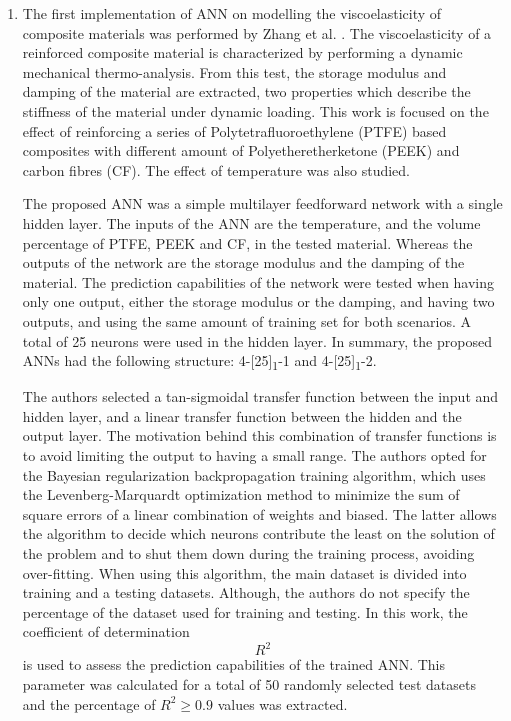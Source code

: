 \begin{enumerate}
    \item The first implementation of ANN on modelling the viscoelasticity of composite materials was performed by Zhang et al. \cite{zhang2002dynamic}. The viscoelasticity of a reinforced composite material is characterized by performing a dynamic mechanical thermo-analysis. From this test, the storage modulus and damping of the material are extracted, two properties which describe the stiffness of the material under dynamic loading. This work is focused on the effect of reinforcing a series of Polytetrafluoroethylene (PTFE) based composites with different amount of Polyetheretherketone (PEEK) and carbon fibres (CF). The effect of temperature was also studied. 
    
    The proposed ANN was a simple multilayer feedforward network with a single hidden layer. The inputs of the ANN are the temperature, and the volume percentage of PTFE, PEEK and CF, in the tested material. Whereas the outputs of the network are the storage modulus and the damping of the material. The prediction capabilities of the network were tested when having only one output, either the storage modulus or the damping, and having two outputs, and using the same amount of training set for both scenarios. A total of 25 neurons were used in the hidden layer. In summary, the proposed ANNs had the following structure: 4-[25]\textsubscript{1}-1 and  4-[25]\textsubscript{1}-2.
    
    The authors selected a tan-sigmoidal transfer function between the input and hidden layer, and a linear transfer function between the hidden and the output layer. The motivation behind this combination of transfer functions is to avoid limiting the output to having a small range. The authors opted for the Bayesian regularization backpropagation training algorithm, which uses the Levenberg-Marquardt optimization method to minimize the sum of square errors of a linear combination of weights and biased. The latter allows the algorithm to decide which neurons contribute the least on the solution of the problem and to shut them down during the training process, avoiding over-fitting. When using this algorithm, the main dataset is divided into training and a testing datasets. Although, the authors do not specify the percentage of the dataset used for training and testing. In this work, the coefficient of determination \[ R^{2} \] is used to assess the prediction capabilities of the trained ANN. This parameter was calculated for a total of 50 randomly selected test datasets and the percentage of $R^{2}\geq0.9$ values was extracted.
    

\end{enumerate}
